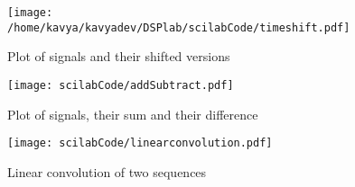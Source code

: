 \begin{figure}
\texttt{[image: /home/kavya/kavyadev/DSPlab/scilabCode/timeshift.pdf]}
\caption{Plot of signals and their shifted versions}
\label{shifted}
\end{figure}


\begin{figure}
\texttt{[image: scilabCode/addSubtract.pdf]}
\caption{Plot of signals, their sum and their difference}
\label{addSub}
\end{figure}

\begin{figure}
\texttt{[image: scilabCode/linearconvolution.pdf]}
\caption{Linear convolution of two sequences}
\label{linconv}
\end{figure}


